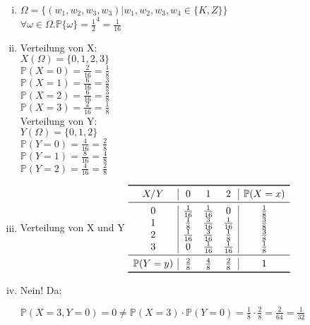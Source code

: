\documentclass[10pt,a4paper,parskip=half]{scrartcl}
\begin{document}
\begin{enumerate}[(i)]
\item  
$ \Omega = \{ (w_1,w_2,w_3,w_3) | w_1,w_2,w_3,w_4 \in \{K,Z\} \} $ \\
$ \forall \omega \in \Omega . \mathbb{P}\{\omega\} = \frac{1}{2}^4 = \frac{1}{16}  $

\item
Verteilung von X:\\
$X(\Omega) = \{0,1,2,3\}$\\
$\mathbb{P}(X = 0) = \frac{2}{16} = \frac{1}{8}$\\
$\mathbb{P}(X = 1) = \frac{6}{16} = \frac{3}{8}$\\
$\mathbb{P}(X = 2) = \frac{6}{16} = \frac{3}{8}$\\
$\mathbb{P}(X = 3) = \frac{2}{16} = \frac{1}{8}$\\

Verteilung von Y:\\
$Y(\Omega) = \{0,1,2\}$\\
$\mathbb{P}(Y = 0) = \frac{4}{16} = \frac{2}{8}$\\
$\mathbb{P}(Y = 1) = \frac{8}{16} = \frac{4}{8}$\\
$\mathbb{P}(Y = 2) = \frac{4}{16} = \frac{2}{8}$\\

\item\leavevmode\vadjust{\vspace{-\baselineskip}}\newline
Verteilung von X und Y
\begin{math}
\begin{array}{c | c c c | c}
\toprule
X/Y & 0 & 1 & 2 & \mathbb{P}(X=x) \\
\midrule
0 & \frac{1}{16} & \frac{1}{16} & 0 & \frac{1}{8} \\
1 & \frac{1}{8} & \frac{3}{16} & \frac{1}{16} & \frac{3}{8} \\
2 & \frac{1}{16} & \frac{3}{16} & \frac{1}{8} & \frac{3}{8} \\
3 & 0 & \frac{1}{16} & \frac{1}{16} & \frac{1}{8} \\ \midrule
\mathbb{P}(Y=y) & \frac{2}{8} & \frac{4}{8} & \frac{2}{8} & 1 \\
\bottomrule
\end{array}
\end{math}

\item
Nein! Da: \\\begin{center}
 $\mathbb{P}(X  = 3, Y = 0) = 0 \neq \mathbb{P}(X = 3) \cdot \mathbb{P}(Y = 0) = \frac{1}{8} \cdot \frac{2}{8} = \frac{2}{64} = \frac{1}{32}$
\end{center}
\end{enumerate}
\end{document}
